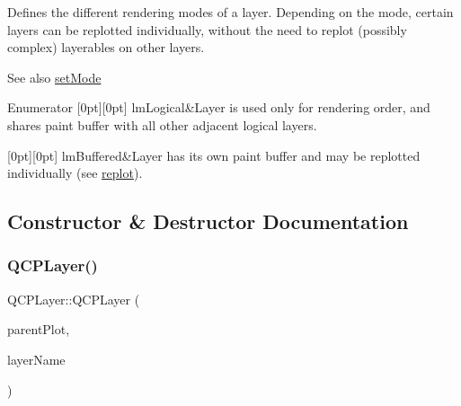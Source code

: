 Defines the different rendering modes of a layer. Depending on the mode, certain layers can be replotted individually, without the need to replot (possibly complex) layerables on other layers.

\begin{DoxySeeAlso}{See also}
\hyperlink{classQCPLayer_a938d57b04f4e4c23cedf1711f983919b}{set\+Mode} 
\end{DoxySeeAlso}
\begin{DoxyEnumFields}{Enumerator}
[0pt][0pt]{}\mbox{\label{classQCPLayer_a67dcfc1590be2a1f2227c5a39bb59c7ca02eb5e9a4cb7f1baf1e2b6b99e3b87ce}} 
lm\+Logical&Layer is used only for rendering order, and shares paint buffer with all other adjacent logical layers. \\
\hline

[0pt][0pt]{}\mbox{\label{classQCPLayer_a67dcfc1590be2a1f2227c5a39bb59c7cab581b9fab3007c4c65f057f4185d7538}} 
lm\+Buffered&Layer has its own paint buffer and may be replotted individually (see \hyperlink{classQCPLayer_adefd53b6db02f470151c416f42e37180}{replot}). \\
\hline

\end{DoxyEnumFields}


\subsection{Constructor \& Destructor Documentation}
\mbox{\label{classQCPLayer_a5d0657fc86d624e5efbe930ef21af718}} 
\subsubsection{\texorpdfstring{Q\+C\+P\+Layer()}{QCPLayer()}}
{\footnotesize\ttfamily Q\+C\+P\+Layer\+::\+Q\+C\+P\+Layer (\begin{DoxyParamCaption}\item[{\hyperlink{classQCustomPlot}{Q\+Custom\+Plot} $\ast$}]{parent\+Plot,  }\item[{const Q\+String \&}]{layer\+Name }\end{DoxyParamCaption})}


